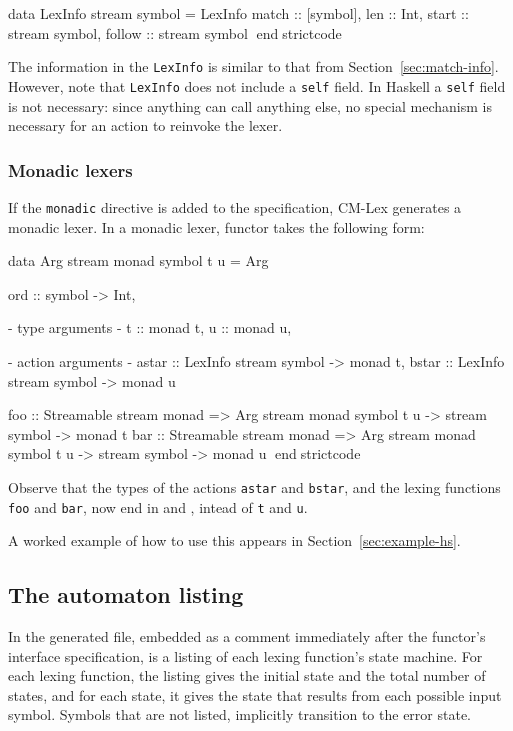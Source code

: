 \documentclass[10pt]{article}
\begin{document}
\begin{strictcode}
\begin{strictcode}
\begin{strictcode}
data LexInfo stream symbol =
   LexInfo
   { match :: [symbol],
     len :: Int,
     start :: stream symbol,
     follow :: stream symbol }
endstrictcode

The information in the {\tt LexInfo} is similar to that from
Section~\ref{sec:match-info}.  However, note that {\tt LexInfo} does
not include a {\tt self} field.  In Haskell a {\tt self} field is not
necessary: since anything can call anything else, no special mechanism
is necessary for an action to reinvoke the lexer.


\subsubsection{Monadic lexers}

If the {\tt monadic} directive is added to the specification, CM-Lex
generates a monadic lexer.  In a monadic lexer, functor takes the
following form:

\begin{strictcode}
data Arg stream monad symbol t u =
   Arg { ord :: symbol -> Int,

         {- type arguments -}
         t :: monad t,
         u :: monad u,

         {- action arguments -}
         astar :: LexInfo stream symbol -> monad t,
         bstar :: LexInfo stream symbol -> monad u }

foo :: Streamable stream monad
       => Arg stream monad symbol t u -> stream symbol -> monad t
bar :: Streamable stream monad
       => Arg stream monad symbol t u -> stream symbol -> monad u
endstrictcode

Observe that the types of the actions {\tt astar} and {\tt bstar}, and
the lexing functions {\tt foo} and {\tt bar}, now end in  and , intead of {\tt t} and {\tt u}.

A worked example of how to use this appears in Section~\ref{sec:example-hs}.



\subsection{The automaton listing}

In the generated file, embedded as a comment immediately after the
functor's interface specification, is a listing of each lexing
function's state machine.  For each lexing function, the listing gives
the initial state and the total number of states, and for each state,
it gives the state that results from each possible input symbol.
Symbols that are not listed, implicitly transition to the error
state.




\end{strictcode}
\end{strictcode}
\end{strictcode}
\end{strictcode}
\end{document}
